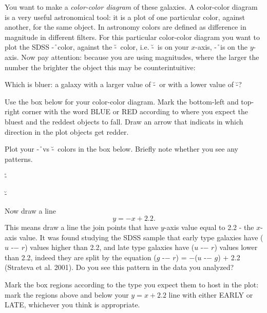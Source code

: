 \noindent 
You want to make a \emph{color-color diagram} of these galaxies. A color-color diagram is a very useful astronomical tool: it is a plot of one particular color, against another, for the same object.  In astronomy colors are defined as difference in magnitude in different filters. For this particular color-color diagram you want to plot the SDSS \g-\r \ color, against the \u-\g \ color, i.e. \u-\g \ is on your $x$-axis, \g-\r \ is on the $y$-axis. Now pay attention: because you are using magnitudes, where the larger the number the brighter the object this may be counterintuitive:

 Which is bluer: a galaxy with a larger value of \u-\g \ or with a lower value of \u-\g?

\noindent 
Use the box below for your color-color diagram. Mark the bottom-left and top-right corner with the word BLUE or RED according to where you expect the bluest and the reddest objects to fall. Draw an arrow that indicats in which direction in the plot objects get redder.

\noindent
Plot your \g-\r \ vs \u-\g \ colors in the box below. Briefly note whether you see any patterns.
\clearpage

\begin{center}
\bigskip

\noindent
\g-\r ~{\framebox[8.0cm]{\rule[-4cm]{0cm}{8cm}\,} \hspace{0.5cm}}

\u-\g
\end{center}

\noindent
Now draw a line $$y=-x+2.2.$$ This means draw a line the join points that have $y$-axis value equal to 2.2 - the $x$-axis value. It was found studying the SDSS sample that early type galaxies have ($u$ -− $r$) values higher than 2.2, and late type galaxies have ($u$ -− $r$) values lower than 2.2, indeed they are split by the equation ($g$ -− $r$) = −($u$ -− $g$) + 2.2 (Strateva et al. 2001). Do you see this pattern in the data you analyzed? 

\bigskip
\noindent
Mark the box regions according to the type you expect them to host in the plot: mark the regions above and below your $y=x+2.2$ line with either EARLY or LATE, whichever you think is appropriate. 

\clearpage


